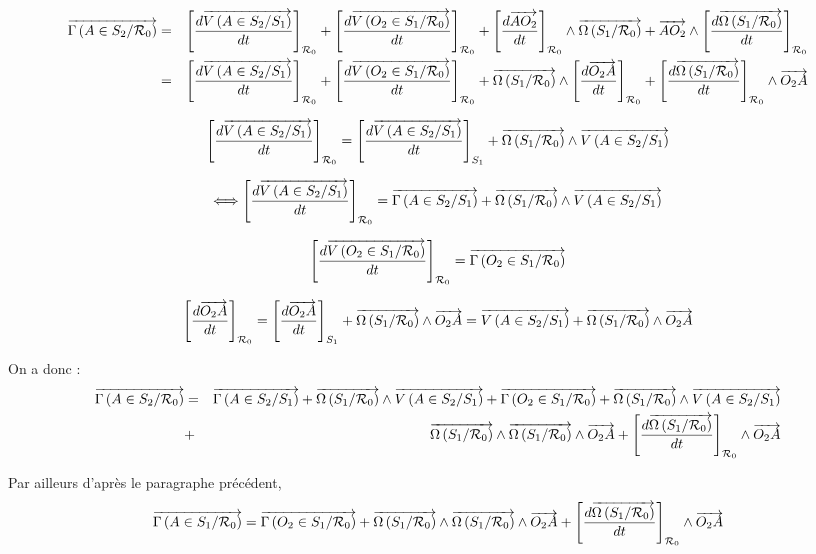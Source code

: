 \documentclass[10pt,oneside]{article}
\begin{document}
\begin{eqnarray*}
\vectg{A}{S_2}{\mathcal{R}_0}
&=&
\left[
\dfrac{d
\vectv{A}{S_2}{S_1} }{dt}
\right]_{\mathcal{R}_0}
+ 
\left[
\dfrac{d\vectv{O_2}{S_1}{\mathcal{R}_0}}{dt}
\right]_{\mathcal{R}_0}
+
\left[
\dfrac{d\vect{AO_2}}{dt}
\right]_{\mathcal{R}_0}
\wedge 
\vecto{S_1}{\mathcal{R}_0}
+
\vect{AO_2}
\wedge 
\left[
\dfrac{d\vecto{S_1}{\mathcal{R}_0}}{dt}
\right]_{\mathcal{R}_0}\\
&=&
\left[
\dfrac{d
\vectv{A}{S_2}{S_1} }{dt}
\right]_{\mathcal{R}_0}
+ 
\left[
\dfrac{d\vectv{O_2}{S_1}{\mathcal{R}_0}}{dt}
\right]_{\mathcal{R}_0}
+
\vecto{S_1}{\mathcal{R}_0}
\wedge 
\left[
\dfrac{d\vect{O_2A}}{dt}
\right]_{\mathcal{R}_0}
+
\left[
\dfrac{d\vecto{S_1}{\mathcal{R}_0}}{dt}
\right]_{\mathcal{R}_0}
\wedge 
\vect{O_2A}
\end{eqnarray*}

$$
\left[
\dfrac{d
\vectv{A}{S_2}{S_1} }{dt}
\right]_{\mathcal{R}_0}
=
\left[
\dfrac{d
\vectv{A}{S_2}{S_1} }{dt}
\right]_{S_1}
+
\vecto{S_1}{\mathcal{R}_0}\wedge\vectv{A}{S_2}{S_1}
$$

$$
\Longleftrightarrow
\left[
\dfrac{d
\vectv{A}{S_2}{S_1} }{dt}
\right]_{\mathcal{R}_0}
=
\vectg{A}{S_2}{S_1} 
+
\vecto{S_1}{\mathcal{R}_0}\wedge\vectv{A}{S_2}{S_1}
$$


$$
\left[
\dfrac{d\vectv{O_2}{S_1}{\mathcal{R}_0}}{dt}
\right]_{\mathcal{R}_0} 
= \vectg{O_2}{S_1}{\mathcal{R}_0}
$$

$$
\left[
\dfrac{d\vect{O_2A}}{dt}
\right]_{\mathcal{R}_0}
=
\left[
\dfrac{d\vect{O_2A}}{dt}
\right]_{S_1}
+
\vecto{S_1}{\mathcal{R}_0}
\wedge 
\vect{O_2A}
=
\vectv{A}{S_2}{S_1}+
\vecto{S_1}{\mathcal{R}_0}
\wedge 
\vect{O_2A}
$$



On a donc : 
\begin{eqnarray*}
\vectg{A}{S_2}{\mathcal{R}_0}
&=&
\vectg{A}{S_2}{S_1} + \vecto{S_1}{\mathcal{R}_0}\wedge\vectv{A}{S_2}{S_1}
+\vectg{O_2}{S_1}{\mathcal{R}_0}
+\vecto{S_1}{\mathcal{R}_0}\wedge \vectv{A}{S_2}{S_1} \\
&+&\vecto{S_1}{\mathcal{R}_0} \wedge \vecto{S_1}{\mathcal{R}_0} \wedge \vect{O_2A}
+
\left[
\dfrac{d\vecto{S_1}{\mathcal{R}_0}}{dt}
\right]_{\mathcal{R}_0}
\wedge 
\vect{O_2A}
\end{eqnarray*}

Par ailleurs d'après le paragraphe précédent, 
$$
\vectg{A}{S_1}{\mathcal{R}_0} 
= \vectg{O_2}{S_1}{\mathcal{R}_0} 
+\vecto{S_1}{\mathcal{R}_0} \wedge \vecto{S_1}{\mathcal{R}_0}
\wedge \vect{O_2A}
+\left[\dfrac{d\vecto{S_1}{\mathcal{R}_0}}{dt}\right]_{\mathcal{R}_0} \wedge \vect{O_2A} 
$$
\end{document}
